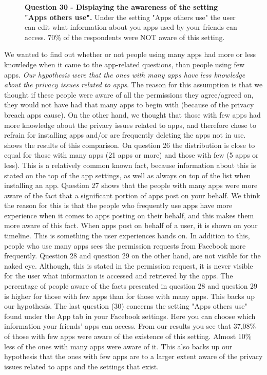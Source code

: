 \begin{figure}[h!]
\centering
{}
\caption[Question 30 - Displaying the awareness of the setting "Apps others use"]{\textbf{Question 30 - Displaying the awareness of the setting "Apps others use".} Under the setting "Apps others use" the user can edit what information about you apps used by your friends can access. 70\% of the respondents were NOT aware of this setting.} 
\label{fig:appsothersuse}
\end{figure}

We wanted to find out whether or not people using many apps had more or less knowledge when it came to the app-related questions, than people using few apps. \textit{Our hypothesis were that the ones with many apps have less knowledge about the privacy issues related to apps}. The reason for this assumption is that we thought if these people were aware of all the permissions they agree/agreed on, they would not have had that many apps to begin with (because of the privacy breach apps cause). On the other hand, we thought that those with few apps had more knowledge about the privacy issues related to apps, and therefore chose to refrain for installing apps and/or are frequently deleting the apps not in use.
 shows the results of this comparison. On question 26 the distribution is close to equal for those with many apps (21 apps or more) and those with few (5 apps or less). This is a relatively common known fact, because information about this is stated on the top of the app settings, as well as always on top of the list when installing an app. Question 27 shows that the people with many apps were more aware of the fact that a significant portion of apps post on your behalf. We think the reason for this is that the people who frequently use apps have more experience when it comes to apps posting on their behalf, and this makes them more aware of this fact. When apps post on behalf of a user, it is shown on your timeline. This is something the user experiences hands on. In addition to this, people who use many apps sees the permission requests from Facebook more frequently. Question 28 and question 29 on the other hand, are not visible for the naked eye. Although, this is stated in the permission request, it is never visible for the user what information is accessed and retrieved by the apps. The percentage of people aware of the facts presented in question 28 and question 29 is higher for those with few apps than for those with many apps. This backs up our hypothesis. The last question (30) concerns the setting "Apps others use" found under the App tab in your Facebook settings. Here you can choose which information your friends' apps can access. From our results you see that 37,08\% of those with few apps were aware of the existence of this setting. Almost 10\% less of the ones with many apps were aware of it. This also backs up our hypothesis that the ones with few apps are to a larger extent aware of the privacy issues related to apps and the settings that exist. 

